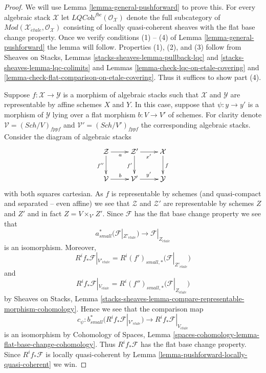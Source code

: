 \documentclass{stacks-project}
\theoremstyle{plain}
\theoremstyle{definition}
\theoremstyle{remark}
\numberwithin{equation}{subsection}
\def\Sch{\mathit{Sch}}
\def\etale{{\acute{e}tale}}
\begin{document}
\begin{proof}
We will use
Lemma \ref{lemma-general-pushforward}
to prove this. For every algebraic stack $\mathcal{X}$ let
$\textit{LQCoh}^{fbc}(\mathcal{O}_\mathcal{X})$ denote the full subcategory of
$\textit{Mod}(\mathcal{X}_\etale, \mathcal{O}_\mathcal{X})$
consisting of locally quasi-coherent sheaves with the flat base
change property. Once we verify conditions (1) -- (4) of
Lemma \ref{lemma-general-pushforward}
the lemma will follow. Properties (1), (2), and (3) follow from
Sheaves on Stacks, Lemmas \ref{stacks-sheaves-lemma-pullback-lqc} and
\ref{stacks-sheaves-lemma-lqc-colimits}
and
Lemmas \ref{lemma-check-lqc-on-etale-covering} and
\ref{lemma-check-flat-comparison-on-etale-covering}.
Thus it suffices to show part (4).

\medskip\noindent
Suppose $f : \mathcal{X} \to \mathcal{Y}$ is a morphism of algebraic stacks
such that $\mathcal{X}$ and $\mathcal{Y}$ are representable by affine
schemes $X$ and $Y$. In this case, suppose that
$\psi : y \to y'$ is a morphism of $\mathcal{Y}$ lying over
a flat morphism $b : V \to V'$ of schemes. For clarity denote
$\mathcal{V} = (\Sch/V)_{fppf}$ and $\mathcal{V}' = (\Sch/V')_{fppf}$
the corresponding algebraic stacks. Consider the diagram
of algebraic stacks
$$
\xymatrix{
\mathcal{Z} \ar[d]_{f''} \ar[r]_a &
\mathcal{Z}' \ar[r]_{x'} \ar[d]_{f'} & \mathcal{X} \ar[d]^f \\
\mathcal{V} \ar[r]^b & \mathcal{V}' \ar[r]^{y'} & \mathcal{Y}
}
$$
with both squares cartesian. As $f$ is representable by schemes
(and quasi-compact and separated -- even affine) we see that $\mathcal{Z}$ and
$\mathcal{Z}'$ are representable by schemes $Z$ and $Z'$ and in
fact $Z = V \times_{V'} Z'$. Since $\mathcal{F}$ has the flat
base change property we see that
$$
a_{small}^*\big(\mathcal{F}|_{Z'_\etale}\big)
\longrightarrow
\mathcal{F}|_{Z_\etale}
$$
is an isomorphism. Moreover,
$$
R^if_*\mathcal{F}|_{V'_\etale} =
R^i(f')_{small, *}\big(\mathcal{F}|_{Z'_\etale}\big)
$$
and
$$
R^if_*\mathcal{F}|_{V_\etale} =
R^i(f'')_{small, *}\big(\mathcal{F}|_{Z_\etale}\big)
$$
by
Sheaves on Stacks, Lemma
\ref{stacks-sheaves-lemma-compare-representable-morphism-cohomology}.
Hence we see that the comparison map
$$
c_\psi :
b_{small}^*(R^if_*\mathcal{F}|_{V'_\etale})
\longrightarrow
R^if_*\mathcal{F}|_{V_\etale}
$$
is an isomorphism by
Cohomology of Spaces, Lemma
\ref{spaces-cohomology-lemma-flat-base-change-cohomology}.
Thus $R^if_*\mathcal{F}$ has the flat base change property.
Since $R^if_*\mathcal{F}$ is locally quasi-coherent by
Lemma \ref{lemma-pushforward-locally-quasi-coherent}
we win.
\end{proof}
\end{document}
